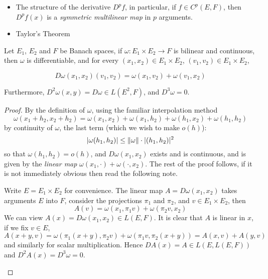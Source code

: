 \documentclass[../main-v2-manifolds.tex]{subfiles}
\begin{document}
\begin{itemize}
    \item The structure of the derivative $D^p f$, in particular, if $f\in C^p(E,F)$, then $D^pf(x)$ is a \emph{symmetric multilinear map} in $p$ arguments. 
    \item Taylor's Theorem
\end{itemize}

\begin{wts}
    Let $E_1$, $E_2$ and $F$ be Banach spaces, if $\omega: E_1\times E_2\to F$ is bilinear and continuous, then $\omega$ is differentiable, and for every $(x_1, x_2)\in E_1\times E_2$, $(v_1,v_2)\in E_1\times E_2$,

    \[
        D\omega(x_1,x_2)(v_1,v_2) = \omega(x_1, v_2) + \omega(v_1, x_2)
    \]

    Furthermore, $D^2\omega(x,y) = D\omega\in L(E^2,F)$, and $D^3\omega = 0$.
    
\end{wts}
\begin{proof}
    By the definition of $\omega$, using the familiar interpolation method
    \[
        \omega(x_1 + h_2, x_2 + h_2) = \omega(x_1, x_2)  + \omega(x_1, h_2) + \omega(h_1, x_2) + \omega(h_1, h_2)
    \]
    by continuity of $\omega$, the last term (which we wish to make $o(h)$): 
    \[
    \vert \omega(h_1, h_2)\vert\leq \norm{\omega}\cdot\vert (h_1, h_2)\vert^2
    \]
    so that $\omega(h_1, h_2) = o(h)$, and $D\omega(x_1, x_2)$ exists and is continuous, and is given by the \emph{linear map} $\omega(x_1, \cdot) + \omega(\cdot, x_2)$. The rest of the proof follows, if it is not immediately obvious then read the following note.
    \begin{note}
        Write $E = E_1\times E_2$ for convenience. The linear map $A = D\omega(x_1, x_2)$ takes arguments $E$ into $F$, consider the projections $\pi_1$ and $\pi_2$, and $v\in E_1\times E_2$, then
        \[A(v) = \omega(x_1, \pi_1 v) + \omega(\pi_2 v, x_2)\]
        We can view $A(x) = D\omega(x_1, x_2)\in L(E,F)$. It is clear that $A$ is linear in $x$, if we fix $v\in E$, 
        \[
            A(x+y, v) = \omega(\pi_1(x+y), \pi_2 v) + \omega(\pi_1 v, \pi_2 (x+y)) = A(x,v) + A(y,v)
        \]
        and similarly for scalar multiplication. Hence $DA(x) = A\in L(E, L(E,F))$ and $D^2A(x) = D^3\omega = 0$.
    \end{note}
\end{proof}
\end{document}
